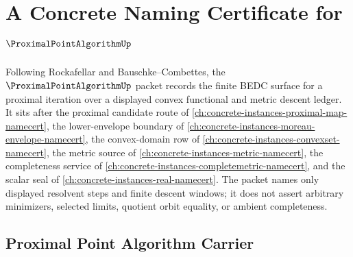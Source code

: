 \chapter{A Concrete Naming Certificate for $\ProximalPointAlgorithmUp$}
\label{ch:concrete-instances-proximal-point-algorithm-namecert}

Following Rockafellar and Bauschke--Combettes, the $\ProximalPointAlgorithmUp$ packet records the finite BEDC surface for a proximal iteration over a displayed convex functional and metric descent ledger. It sits after the proximal candidate route of \autoref{ch:concrete-instances-proximal-map-namecert}, the lower-envelope boundary of \autoref{ch:concrete-instances-moreau-envelope-namecert}, the convex-domain row of \autoref{ch:concrete-instances-convexset-namecert}, the metric source of \autoref{ch:concrete-instances-metric-namecert}, the completeness service of \autoref{ch:concrete-instances-completemetric-namecert}, and the scalar seal of \autoref{ch:concrete-instances-real-namecert}. The packet names only displayed resolvent steps and finite descent windows; it does not assert arbitrary minimizers, selected limits, quotient orbit equality, or ambient completeness.

\section{Proximal Point Algorithm Carrier}
\label{sec:proximal-point-algorithm-carrier}


